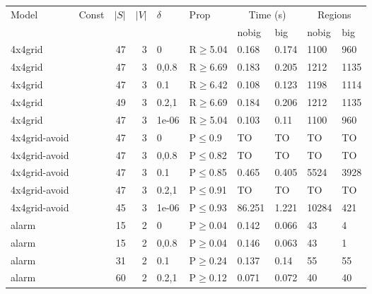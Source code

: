 \begin{longtable}{llrrllllll}

        \toprule
        Model & Const & $|S|$ & $|V|$ & $\delta$ & Prop & \multicolumn{2}{c}{Time (s)} & \multicolumn{2}{c}{Regions} \\
        \cmidrule(ll){7-8} \cmidrule(ll){9-10}
        & & & & & & nobig & big & nobig & big \\
        \midrule
        
 4x4grid       &           &     	47 &    3 & 0     & R$\geq$5.04  & 0.168    & 0.174    & 1100    & 960     \\
 4x4grid       &           &     	47 &    3 & 0,0.8 & R$\geq$6.69  & 0.183    & 0.205    & 1212    & 1135    \\
 4x4grid       &           &     	47 &    3 & 0.1   & R$\geq$6.42  & 0.108    & 0.123    & 1198    & 1114    \\
 4x4grid       &           &     	49 &    3 & 0.2,1 & R$\geq$6.69  & 0.184    & 0.206    & 1212    & 1135    \\
 4x4grid       &           &     	47 &    3 & 1e-06 & R$\geq$5.04  & 0.103    & 0.11     & 1100    & 960     \\
 4x4grid-avoid &           &     	47 &    3 & 0     & P$\leq$0.9   & TO       & TO       & TO      & TO      \\
 4x4grid-avoid &           &     	47 &    3 & 0,0.8 & P$\leq$0.82  & TO       & TO       & TO      & TO      \\
 4x4grid-avoid &           &     	47 &    3 & 0.1   & P$\leq$0.85  & 0.465    & 0.405    & 5524    & 3928    \\
 4x4grid-avoid &           &     	47 &    3 & 0.2,1 & P$\leq$0.91  & TO       & TO       & TO      & TO      \\
 4x4grid-avoid &           &     	45 &    3 & 1e-06 & P$\leq$0.93  & 86.251   & 1.221    & 10284   & 421     \\
 alarm         &           &     	15 &    2 & 0     & P$\geq$0.04  & 0.142    & 0.066    & 43      & 4       \\
 alarm         &           &     	15 &    2 & 0,0.8 & P$\geq$0.04  & 0.146    & 0.063    & 43      & 1       \\
 alarm         &           &     	31 &    2 & 0.1   & P$\geq$0.24  & 0.137    & 0.14     & 55      & 55      \\
 alarm         &           &     	60 &    2 & 0.2,1 & P$\geq$0.12  & 0.071    & 0.072    & 40      & 40      \\

\end{longtable}
